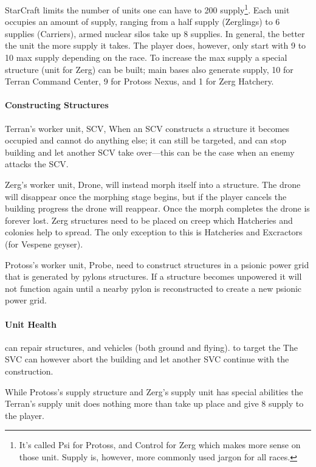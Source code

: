 StarCraft limits the number of units one can have to 200 supply\footnote{It’s called Psi for Protoss, and Control for Zerg which makes more sense on those unit. Supply is, however, more commonly used jargon for all races.}. Each unit occupies an amount of supply, ranging from a half supply (Zerglings) to 6 supplies (Carriers), armed nuclear silos take up 8 supplies. In general, the better the unit the more supply it takes. The player does, however, only start with 9 to 10 max supply depending on the race. To increase the max supply a special structure (unit for Zerg) can be built; main bases also generate supply, 10 for Terran Command Center, 9 for Protoss Nexus, and 1 for Zerg Hatchery.

\paragraph{Constructing Structures}
Terran's worker unit, SCV,  When an SCV constructs a structure it becomes occupied and cannot do anything else; it can still be targeted, and can stop building and let another SCV take over—this can be the case when an enemy attacks the SCV.

Zerg’s worker unit, Drone, will instead morph itself into a structure. The drone will disappear once the morphing stage begins, but if the player cancels the building progress the drone will reappear. Once the morph completes the drone is forever lost. Zerg structures need to be placed on creep which Hatcheries and colonies help to spread. The only exception to this is Hatcheries and Excractors (for Vespene geyser).

Protoss’s worker unit, Probe, need to construct structures in a psionic power grid that is generated by pylons structures. If a structure becomes unpowered it will not function again until a nearby pylon is reconstructed to create a new psionic power grid.

\paragraph{Unit Health}


can repair structures, and vehicles (both ground and flying).
to target the 
The SVC can however abort the building and let another SVC continue with the construction.

While Protoss's supply structure and Zerg's supply unit has special abilities the Terran's supply unit does nothing more than take up place and give 8 supply to the player.

